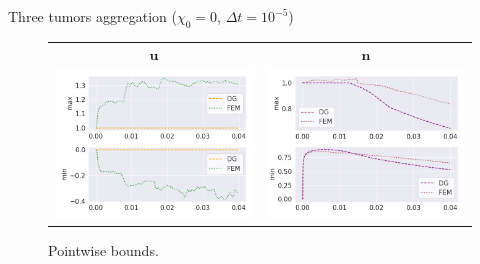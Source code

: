 \begin{frame}{Three tumors aggregation ($\chi_0=0$, $\Delta t=10^{-5}$)}
	\begin{figure}
		\centering
		\begin{tabular}{cc}
			\hspace*{1cm}$\boldsymbol{u}$ & \hspace*{0.5cm}$\boldsymbol{n}$\\
			\includegraphics[scale=0.33]{img/three_tumors/tumor_min-max_u_chi-10.png} &
			\includegraphics[scale=0.33]{img/three_tumors/tumor_min-max_n_chi-10.png}
		\end{tabular}
		\caption{Pointwise bounds.}
	\end{figure}
\end{frame}
